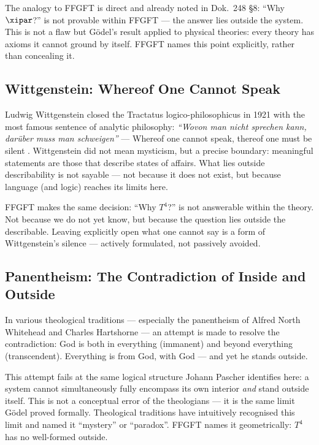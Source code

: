 The analogy to FFGFT is direct and already noted in Dok.~248 §8: ``Why $\xipar$?'' is not provable within FFGFT --- the answer lies outside the system. This is not a flaw but Gödel's result applied to physical theories: every theory has axioms it cannot ground by itself. FFGFT names this point explicitly, rather than concealing it.

\subsection{Wittgenstein: Whereof One Cannot Speak}

Ludwig Wittgenstein closed the Tractatus logico-philosophicus in 1921 with the most famous sentence of analytic philosophy: \emph{``Wovon man nicht sprechen kann, darüber muss man schweigen''} --- Whereof one cannot speak, thereof one must be silent \cite{Wittgenstein1921}. Wittgenstein did not mean mysticism, but a precise boundary: meaningful statements are those that describe states of affairs. What lies outside describability is not sayable --- not because it does not exist, but because language (and logic) reaches its limits here.

FFGFT makes the same decision: ``Why $T^4$?'' is not answerable within the theory. Not because we do not yet know, but because the question lies outside the describable. Leaving explicitly open what one cannot say is a form of Wittgenstein's silence --- actively formulated, not passively avoided.

\subsection{Panentheism: The Contradiction of Inside and Outside}

In various theological traditions --- especially the panentheism of Alfred North Whitehead \cite{Whitehead1929} and Charles Hartshorne --- an attempt is made to resolve the contradiction: God is both in everything (immanent) and beyond everything (transcendent). Everything is from God, with God --- and yet he stands outside.

This attempt fails at the same logical structure Johann Pascher identifies here: a system cannot simultaneously fully encompass its own interior \emph{and} stand outside itself. This is not a conceptual error of the theologians --- it is the same limit Gödel proved formally. Theological traditions have intuitively recognised this limit and named it ``mystery'' or ``paradox''. FFGFT names it geometrically: $T^4$ has no well-formed outside.

